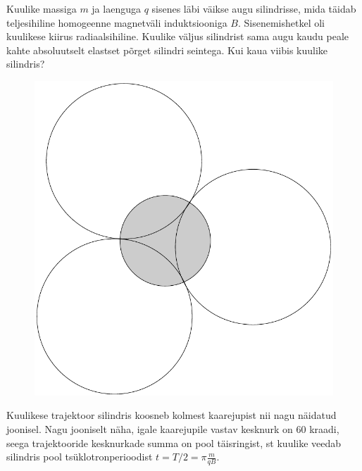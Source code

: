\setAuthor{}

Kuulike massiga $m$ ja laenguga $q$ sisenes läbi väikse augu silindrisse, mida täidab teljesihiline homogeenne magnetväli induktsiooniga $B$. Sisenemishetkel oli kuulikese kiirus radiaalsihiline. Kuulike väljus silindrist sama augu kaudu peale kahte absoluutselt elastset põrget silindri seintega. Kui kaua viibis kuulike silindris? 
\vspace{-5pt}


\hint

\solu
\begin{figure}
  \vspace{-25pt}
  \begin{center}
\includegraphics[scale=0.3]{2019-v3g-06-sol.pdf}
  \end{center}
  \vspace{-20pt}
\end{figure}

Kuulikese trajektoor silindris koosneb kolmest kaarejupist nii nagu näidatud joonisel. Nagu jooniselt näha, igale kaarejupile vastav kesknurk on 60 kraadi, seega trajektooride kesknurkade summa on pool täisringist, st kuulike veedab silindris pool tsüklotronperioodist  $t=T/2=\pi\frac m{qB}$.
\probend